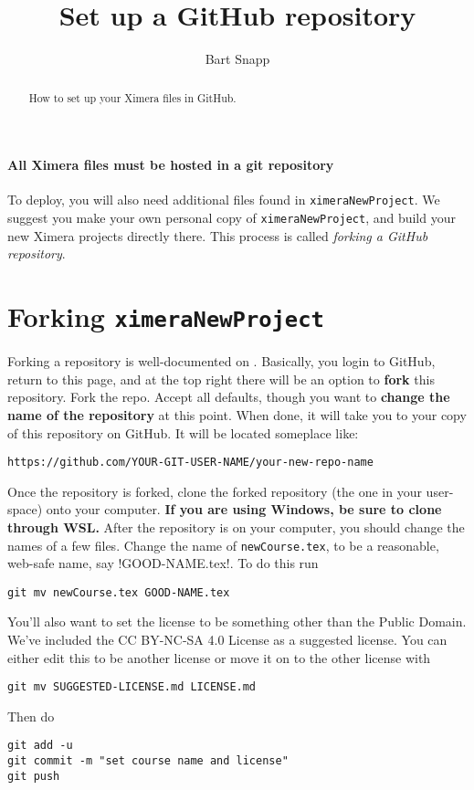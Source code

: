 \documentclass{ximera}
\title{Set up a GitHub repository}
\author{Bart Snapp}
\begin{document}
\begin{abstract}
  How to set up your Ximera files in GitHub.
\end{abstract}
\maketitle

\paragraph{All Ximera files must be hosted in a git repository} To deploy, you
will also need	additional
files found in \verb!ximeraNewProject!. We suggest you make your own personal copy of  \verb!ximeraNewProject!, and build your new Ximera projects directly there.
This process is called \textit{forking a GitHub repository}.



\section{Forking \texttt{ximeraNewProject}}

Forking a repository is well-documented on
.
Basically, you login to GitHub, return to this page, and at the top right there
will be an option to \textbf{fork} this repository. Fork the repo. Accept all
defaults, though you want to \textbf{change the name of the repository} at this
point. When done, it will take you to
your copy of this repository on GitHub. It will be located someplace like:
\begin{center}
  \texttt{https://github.com/YOUR-GIT-USER-NAME/your-new-repo-name}
\end{center}
Once the repository is forked, clone the forked repository (the one in your
user-space) onto your computer. \textbf{If you are using Windows, be sure to
  clone through WSL.}
After the repository is on your computer, you should change the names of a few files. Change the name of \verb!newCourse.tex!, to be a reasonable, web-safe name, say !GOOD-NAME.tex!. 
To do this run
\begin{verbatim}
git mv newCourse.tex GOOD-NAME.tex
\end{verbatim}
You'll also want to set the license to be something other than the Public Domain. We've included the CC BY-NC-SA 4.0
License as a suggested license. You can either edit this to be another license or move it on to the other license with
\begin{verbatim}
git mv SUGGESTED-LICENSE.md LICENSE.md
\end{verbatim}
Then do
\begin{verbatim}
git add -u 
git commit -m "set course name and license"
git push
\end{verbatim}
\end{document}
